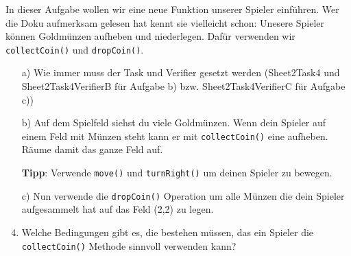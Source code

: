 

In dieser Aufgabe wollen wir eine neue Funktion unserer Spieler einführen. 
Wer die Doku aufmerksam gelesen hat kennt sie vielleicht schon: 
Unesere Spieler können Goldmünzen aufheben und niederlegen. 
Dafür verwenden wir \lstinline{collectCoin()} und \lstinline{dropCoin()}.

\begin{enumerate}
    \item[a)] Wie immer muss der Task und Verifier gesetzt werden (Sheet2Task4 und Sheet2Task4VerifierB für Aufgabe b) bzw. Sheet2Task4VerifierC für Aufgabe c))
    \item[b)] Auf dem Spielfeld siehst du viele Goldmünzen.
        Wenn dein Spieler auf einem Feld mit Münzen steht kann er mit \lstinline{collectCoin()} eine aufheben.
        Räume damit das ganze Feld auf.
        
        \textbf{Tipp}: Verwende \lstinline{move()} und \lstinline{turnRight()} um deinen Spieler zu bewegen.

    \item[c)] Nun verwende die \lstinline{dropCoin()} Operation um alle Münzen die dein Spieler aufgesammelt hat auf das Feld (2,2) zu legen.
    \item[d)] Welche Bedingungen gibt es, die bestehen müssen, das ein Spieler die \lstinline{collectCoin()} Methode sinnvoll verwenden kann? 
\end{enumerate}
